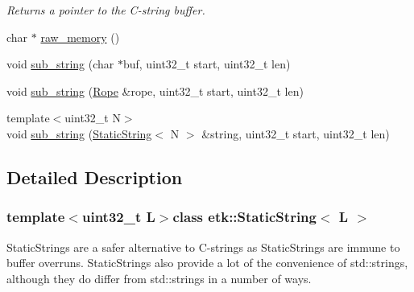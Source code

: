 \begin{DoxyCompactItemize}
\begin{DoxyCompactList}\small\item\em Returns a pointer to the C-\/string buffer. \end{DoxyCompactList}\item 
char $\ast$ \hyperlink{classetk_1_1_static_string_ac305f5f280538b783ef70865c173b14a}{raw\-\_\-memory} ()
\item 
void \hyperlink{classetk_1_1_static_string_a003d54ec39d1a35ef5b1c3ba7c88dee2}{sub\-\_\-string} (char $\ast$buf, uint32\-\_\-t start, uint32\-\_\-t len)
\item 
void \hyperlink{classetk_1_1_static_string_a58b9a096ce1d77c2c13df89418dacd22}{sub\-\_\-string} (\hyperlink{classetk_1_1_rope}{Rope} \&rope, uint32\-\_\-t start, uint32\-\_\-t len)
\item 
{\footnotesize template$<$uint32\-\_\-t N$>$ }\\void \hyperlink{classetk_1_1_static_string_a262a8ed592e1ab95151c6ee9f3ab149c}{sub\-\_\-string} (\hyperlink{classetk_1_1_static_string}{Static\-String}$<$ N $>$ \&string, uint32\-\_\-t start, uint32\-\_\-t len)
\end{DoxyCompactItemize}


\subsection{Detailed Description}
\subsubsection*{template$<$uint32\-\_\-t L$>$class etk\-::\-Static\-String$<$ L $>$}

Static\-Strings are a safer alternative to C-\/strings as Static\-Strings are immune to buffer overruns. Static\-Strings also provide a lot of the convenience of std\-::strings, although they do differ from std\-::strings in a number of ways. 


